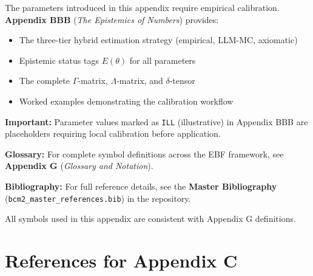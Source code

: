 \begin{tcolorbox}[colback=blue!5!white, colframe=blue!75!black, 
    title=\textbf{Parameter Calibration: See Appendix BBB}]
    
The parameters introduced in this appendix require empirical calibration. 
\textbf{Appendix BBB} (\textit{The Epistemics of Numbers}) provides:

\begin{itemize}[nosep]
    \item The three-tier hybrid estimation strategy (empirical, LLM-MC, axiomatic)
    \item Epistemic status tags $E(\theta)$ for all parameters
    \item The complete $\Gamma$-matrix, $\Lambda$-matrix, and $\delta$-tensor
    \item Worked examples demonstrating the calibration workflow
\end{itemize}

\textbf{Important:} Parameter values marked as \texttt{ILL} (illustrative) in 
Appendix BBB are placeholders requiring local calibration before application.

\end{tcolorbox}





\begin{tcolorbox}[colback=blue!5!white, colframe=blue!75!black, 
    title=\textbf{Central References}]

\textbf{Glossary:} For complete symbol definitions across the EBF framework, 
see \textbf{Appendix G} (\textit{Glossary and Notation}).

\textbf{Bibliography:} For full reference details, see the 
\textbf{Master Bibliography} (\texttt{bcm2\_master\_references.bib}) 
in the repository.

All symbols used in this appendix are consistent with Appendix G definitions.

\end{tcolorbox}

\section{References for Appendix C}
\label{sec:app-c-references}

